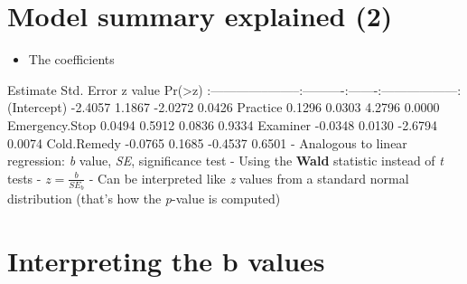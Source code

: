 \documentclass[]{article}
\begin{document}
\section{Model summary explained (2)}\label{model-summary-explained-2}

\begin{itemize}
\itemsep1pt\parskip0pt
\item
  The coefficients
\end{itemize}

\textbar{} \textbar{} Estimate\textbar{} Std. Error\textbar{} z
value\textbar{} Pr(\textgreater{}\textbar{}z\textbar{})\textbar{}
\textbar{}:--------------\textbar{}--------:\textbar{}----------:\textbar{}-------:\textbar{}------------------:\textbar{}
\textbar{}(Intercept) \textbar{} -2.4057\textbar{} 1.1867\textbar{}
-2.0272\textbar{} 0.0426\textbar{} \textbar{}Practice \textbar{}
0.1296\textbar{} 0.0303\textbar{} 4.2796\textbar{} 0.0000\textbar{}
\textbar{}Emergency.Stop \textbar{} 0.0494\textbar{} 0.5912\textbar{}
0.0836\textbar{} 0.9334\textbar{} \textbar{}Examiner \textbar{}
-0.0348\textbar{} 0.0130\textbar{} -2.6794\textbar{} 0.0074\textbar{}
\textbar{}Cold.Remedy \textbar{} -0.0765\textbar{} 0.1685\textbar{}
-0.4537\textbar{} 0.6501\textbar{} - Analogous to linear regression:
\emph{b} value, \emph{SE}, significance test - Using the \textbf{Wald}
statistic instead of \emph{t} tests - $z = \frac{b}{SE_b}$ - Can be
interpreted like \emph{z} values from a standard normal distribution
(that's how the \emph{p}-value is computed)

\section{Interpreting the b values}\label{interpreting-the-b-values}
\end{document}
